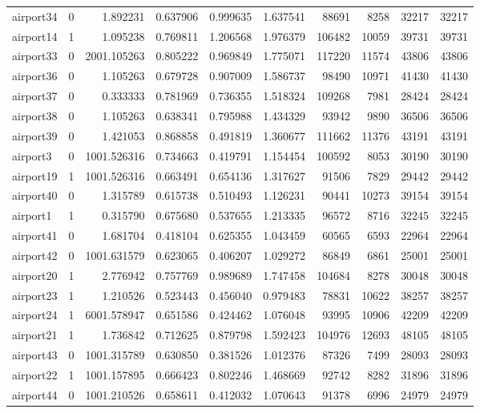 \documentclass[../../../thesis.tex]{subfiles}
\begin{document}
\begin{longtable}{|l|r|r|r|r|r|r|r|r|r|}
airport34 & 0 & 1.892231 & 0.637906 & 0.999635 & 1.637541 & 88691 & 8258 & 32217 & 32217 \\
airport14 & 1 & 1.095238 & 0.769811 & 1.206568 & 1.976379 & 106482 & 10059 & 39731 & 39731 \\
airport33 & 0 & 2001.105263 & 0.805222 & 0.969849 & 1.775071 & 117220 & 11574 & 43806 & 43806 \\
airport36 & 0 & 1.105263 & 0.679728 & 0.907009 & 1.586737 & 98490 & 10971 & 41430 & 41430 \\
airport37 & 0 & 0.333333 & 0.781969 & 0.736355 & 1.518324 & 109268 & 7981 & 28424 & 28424 \\
airport38 & 0 & 1.105263 & 0.638341 & 0.795988 & 1.434329 & 93942 & 9890 & 36506 & 36506 \\
airport39 & 0 & 1.421053 & 0.868858 & 0.491819 & 1.360677 & 111662 & 11376 & 43191 & 43191 \\
airport3 & 0 & 1001.526316 & 0.734663 & 0.419791 & 1.154454 & 100592 & 8053 & 30190 & 30190 \\
airport19 & 1 & 1001.526316 & 0.663491 & 0.654136 & 1.317627 & 91506 & 7829 & 29442 & 29442 \\
airport40 & 0 & 1.315789 & 0.615738 & 0.510493 & 1.126231 & 90441 & 10273 & 39154 & 39154 \\
airport1 & 1 & 0.315790 & 0.675680 & 0.537655 & 1.213335 & 96572 & 8716 & 32245 & 32245 \\
airport41 & 0 & 1.681704 & 0.418104 & 0.625355 & 1.043459 & 60565 & 6593 & 22964 & 22964 \\
airport42 & 0 & 1001.631579 & 0.623065 & 0.406207 & 1.029272 & 86849 & 6861 & 25001 & 25001 \\
airport20 & 1 & 2.776942 & 0.757769 & 0.989689 & 1.747458 & 104684 & 8278 & 30048 & 30048 \\
airport23 & 1 & 1.210526 & 0.523443 & 0.456040 & 0.979483 & 78831 & 10622 & 38257 & 38257 \\
airport24 & 1 & 6001.578947 & 0.651586 & 0.424462 & 1.076048 & 93995 & 10906 & 42209 & 42209 \\
airport21 & 1 & 1.736842 & 0.712625 & 0.879798 & 1.592423 & 104976 & 12693 & 48105 & 48105 \\
airport43 & 0 & 1001.315789 & 0.630850 & 0.381526 & 1.012376 & 87326 & 7499 & 28093 & 28093 \\
airport22 & 1 & 1001.157895 & 0.666423 & 0.802246 & 1.468669 & 92742 & 8282 & 31896 & 31896 \\
airport44 & 0 & 1001.210526 & 0.658611 & 0.412032 & 1.070643 & 91378 & 6996 & 24979 & 24979 \\

\end{longtable}
\end{document}
